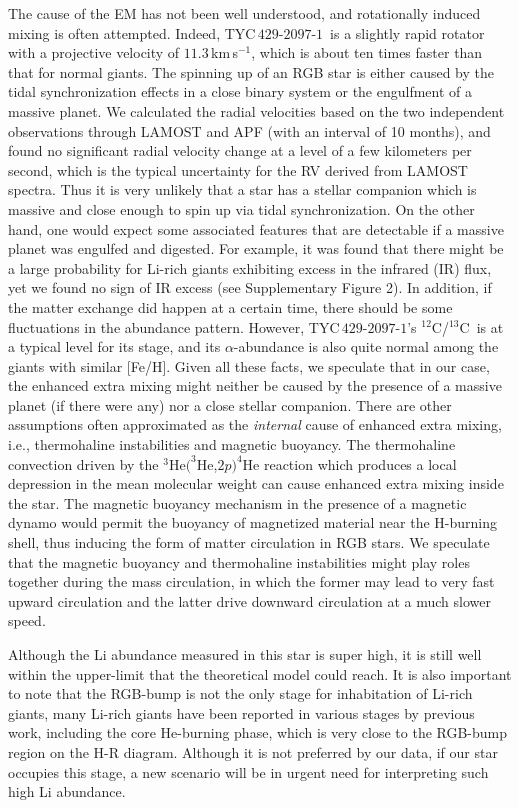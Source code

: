 \documentclass[twoside,onecolumnm,12pt]{article}
\newcommand{\upcite}[1]{\textsuperscript{\textsuperscript{\cite{#1}}}}
\newcommand{\kms}{km\,s$^{-1}$}
\newcommand{\starname}{TYC\,$429$-$2097$-$1$}
\newcommand{\ciso}{$^{12}$C/$^{13}$C}
\begin{document}
The cause of the EM has not been well understood, and rotationally
induced mixing is often attempted. Indeed, \starname\ is a slightly
rapid rotator with a projective velocity of
$11.3$\,\kms, which is about ten times faster than that for normal
giants. The spinning up of an RGB star is either caused by the tidal
synchronization effects in a close binary system or the engulfment
of a massive planet\upcite{Denissenkov2004, Alexander1967}. We
calculated the radial velocities based on the two independent
observations through LAMOST and APF (with an interval of 10 months),
and found no significant radial velocity change at a level of a few
kilometers per second, which is the typical uncertainty for the RV
derived from LAMOST spectra. Thus it is very unlikely that a star
has a stellar companion which is massive and close enough to spin up
via tidal synchronization. On the other hand, one would expect some
associated features that are detectable if a massive planet was
engulfed and digested. For example, it was found that there might be
a large probability for Li-rich giants exhibiting excess in the
infrared (IR) flux, yet we found no sign of IR excess 
(see Supplementary Figure 2).
In addition, if the matter exchange did happen at a certain time, 
there should be some fluctuations in the abundance
pattern. However, \starname's \ciso\ is at a
typical level for its stage\upcite{Denissenkov2004}, and its
$\alpha$-abundance is also quite normal among the giants with
similar [Fe/H]. Given all these facts, we speculate that in our
case, the enhanced extra mixing might neither be caused by the
presence of a massive planet (if there were any) nor a close stellar
companion. There are other assumptions often approximated as the
\emph{internal} cause of enhanced extra mixing, i.e., thermohaline
instabilities and magnetic buoyancy. The thermohaline convection
driven by the $^3$He$(^3$He,$2p)^4$He reaction which produces a
local depression in the mean molecular weight\upcite{Charbonnel2010}
can cause enhanced extra mixing inside the star.
The magnetic buoyancy mechanism in the presence of a magnetic dynamo
would permit the buoyancy of magnetized material near the H-burning
shell, thus inducing the form of matter circulation in RGB
stars\upcite{Busso2007}. We speculate that the magnetic buoyancy and thermohaline instabilities might play roles together during the mass circulation, in which the former may lead to very fast upward circulation and the latter drive downward circulation at a much slower speed.

Although the Li abundance measured in this star is super high, it is
still well within the upper-limit that the theoretical model could
reach. It is also important to note that the RGB-bump is not the
only stage for inhabitation of Li-rich giants, many Li-rich giants 
have been reported in various stages by previous
work, including the core He-burning phase, which is very close to
the RGB-bump region on the H-R diagram. Although it is not preferred
by our data, if our star occupies this stage, a new scenario will be
in urgent need for interpreting such high Li abundance.
\end{document}
